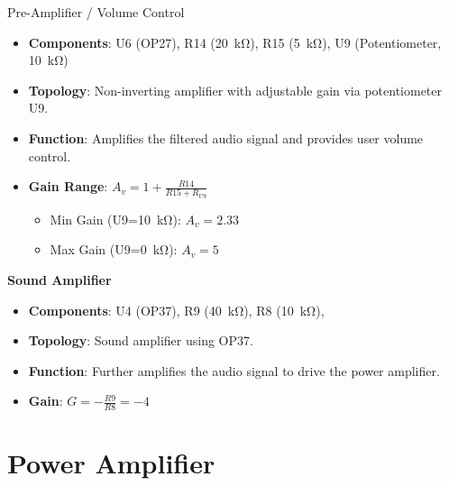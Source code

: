 \documentclass[10pt,xcolor={table,dvipsnames},t]{beamer}
\begin{document}
\begin{frame}{Pre-Amplifier / Volume Control}
\begin{itemize}
    \item \textbf{Components}: U6 (OP27),  R14 (\SI{20}{\kilo\ohm}), R15 (\SI{5}{\kilo\ohm}), U9 (Potentiometer, \SI{10}{\kilo\ohm})
    \item \textbf{Topology}: Non-inverting amplifier with adjustable gain via potentiometer U9.
    \item \textbf{Function}: Amplifies the filtered audio signal and provides user volume control.
    \item \textbf{Gain Range}: $A_v = 1 + \frac{R14}{R15 + R_{U9}}$
    \begin{itemize}
        \item Min Gain (U9=\SI{10}{\kilo\ohm}): $A_v = 2.33$
        \item Max Gain (U9=\SI{0}{\kilo\ohm}): $A_v = 5$
    \end{itemize}
\end{itemize}
\vspace{1em}
\textbf{Sound Amplifier}
\begin{itemize}
    \item \textbf{Components}: U4 (OP37), R9 (\SI{40}{\kilo\ohm}), R8 (\SI{10}{\kilo\ohm}),
    \item \textbf{Topology}: Sound amplifier using OP37.
    \item \textbf{Function}: Further amplifies the audio signal to drive the power amplifier.
    \item \textbf{Gain}: $G = -\frac{R9}{R8} = -4$
\end{itemize}
\end{frame}

\section{Power Amplifier}
\end{document}
